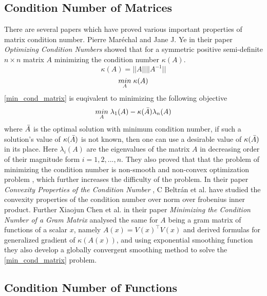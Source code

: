 \subsection{Condition Number of Matrices}
There are several papers which have proved various important properties of matrix condition number. Pierre Maréchal and Jane J. Ye in their paper \textit{Optimizing Condition Numbers}\cite{marechal2009optimizing} showed that for a symmetric positive semi-definite $n\times n$ matrix $A$ minimizing the condition number $\kappa (A)$.
\begin{equation} \label{cond_matrix}
    \kappa (A) = ||A||||A^{-1}||
\end{equation}
\begin{equation} \label{min_cond_matrix}
    \underset{A}{min}\hspace{1mm} \kappa (A)
\end{equation}
\ref{min_cond_matrix} is euqivalent to minimizing the following objective
\begin{equation}
    \underset{A}{min}\hspace{1mm} \lambda_1(A) - \kappa (\Bar{A}) \lambda_n(A)
\end{equation}
where $\Bar{A}$ is the optimal solution with minimum condition number, if such a solution's value of $\kappa (\Bar{A})$ is not known, then one can use a desirable value of $\kappa (\Bar{A})$ in its place. Here $\lambda_i(A)$ are the eigenvalues of the matrix $A$ in decreasing order of their magnitude form $i=1,2,...,n$. They also proved that that the problem of minimizing the condition number is non-smooth and non-convex optimization problem \cite{marechal2009optimizing}, which further increases the difficulty of the problem. In their paper \textit{Convexity Properties of the Condition Number } \cite{beltran2010convexity}, C Beltrán et al. have studied the convexity properties of the condition number over norm over frobenius inner product. Further Xiaojun Chen et al. in their paper \textit{Minimizing the Condition Number of a Gram Matrix} \cite{chen2011minimizing} analysed the same for $A$ being a gram matrix of functions of a scalar $x$, namely $A(x) = V(x)^{\top}V(x)$ and derived formulas for generalized gradient of $\kappa(A(x))$, and using exponential smoothing function they also develop a globally convergent smoothing method to solve the \ref{min_cond_matrix} problem.


\subsection{Condition Number of Functions}

